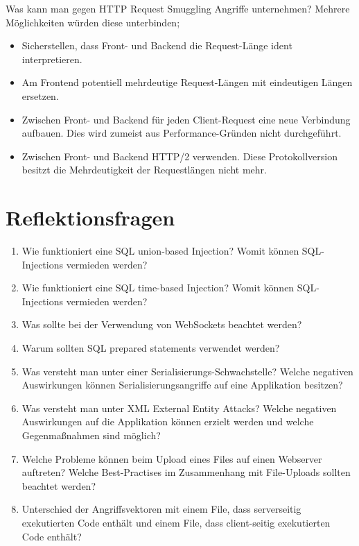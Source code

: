 Was kann man gegen HTTP Request Smuggling Angriffe unternehmen? Mehrere Möglichkeiten würden diese unterbinden;

\begin{itemize}
	\item Sicherstellen, dass Front- und Backend die Request-Länge ident interpretieren.
	\item Am Frontend potentiell mehrdeutige Request-Längen mit eindeutigen Längen ersetzen.
	\item Zwischen Front- und Backend für jeden Client-Request eine neue Verbindung aufbauen. Dies wird zumeist aus Performance-Gründen nicht durchgeführt.
	\item Zwischen Front- und Backend HTTP/2 verwenden. Diese Protokollversion besitzt die Mehrdeutigkeit der Requestlängen nicht mehr.
\end{itemize}

\section{Reflektionsfragen}

\begin{enumerate}
	\item Wie funktioniert eine SQL union-based Injection? Womit können SQL-Injections vermieden werden?
	\item Wie funktioniert eine SQL time-based Injection? Womit können SQL-Injections vermieden werden?
	\item Was sollte bei der Verwendung von WebSockets beachtet werden?
	\item Warum sollten SQL prepared statements verwendet werden?
	\item Was versteht man unter einer Serialisierungs-Schwachstelle? Welche negativen Auswirkungen können Serialisierungsangriffe auf eine Applikation besitzen?
	\item Was versteht man unter XML External Entity Attacks? Welche negativen Auswirkungen auf die Applikation können erzielt werden und welche Gegenmaßnahmen sind möglich?
	\item Welche Probleme können beim Upload eines Files auf einen Webserver auftreten? Welche Best-Practises im Zusammenhang mit File-Uploads sollten beachtet werden?
	\item Unterschied der Angriffsvektoren mit einem File, dass serverseitig exekutierten Code enthält und einem File, dass client-seitig exekutierten Code enthält?
\end{enumerate}
